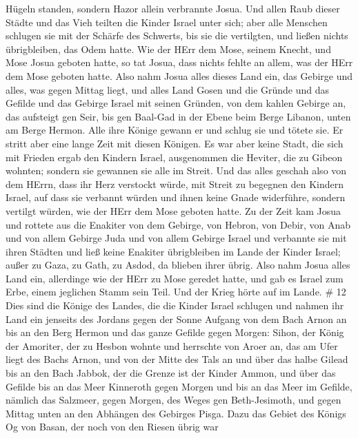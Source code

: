 Hügeln standen, sondern Hazor allein verbrannte Josua.  Und
allen Raub dieser Städte und das Vieh teilten die Kinder Israel unter
sich; aber alle Menschen schlugen sie mit der Schärfe des Schwerts, bis
sie die vertilgten, und ließen nichts übrigbleiben, das Odem hatte.
 Wie der HErr dem Mose, seinem Knecht, und Mose Josua
geboten hatte, so tat Josua, dass nichts fehlte an allem, was der HErr
dem Mose geboten hatte.  Also nahm Josua alles dieses Land
ein, das Gebirge und alles, was gegen Mittag liegt, und alles Land Gosen
und die Gründe und das Gefilde und das Gebirge Israel mit seinen
Gründen,  von dem kahlen Gebirge an, das aufsteigt gen
Seir, bis gen Baal-Gad in der Ebene beim Berge Libanon, unten am Berge
Hermon. Alle ihre Könige gewann er und schlug sie und tötete sie.
 Er stritt aber eine lange Zeit mit diesen Königen.
 Es war aber keine Stadt, die sich mit Frieden ergab den
Kindern Israel, ausgenommen die Heviter, die zu Gibeon wohnten; sondern
sie gewannen sie alle im Streit.  Und das alles geschah
also von dem HErrn, dass ihr Herz verstockt würde, mit Streit zu
begegnen den Kindern Israel, auf dass sie verbannt würden und ihnen
keine Gnade widerführe, sondern vertilgt würden, wie der HErr dem Mose
geboten hatte.  Zu der Zeit kam Josua und rottete aus die
Enakiter von dem Gebirge, von Hebron, von Debir, von Anab und von allem
Gebirge Juda und von allem Gebirge Israel und verbannte sie mit ihren
Städten  und ließ keine Enakiter übrigbleiben im Lande der
Kinder Israel; außer zu Gaza, zu Gath, zu Asdod, da blieben ihrer übrig.
 Also nahm Josua alles Land ein, allerdinge wie der HErr zu
Mose geredet hatte, und gab es Israel zum Erbe, einem jeglichen Stamm
sein Teil. Und der Krieg hörte auf im Lande. \# 12  Dies
sind die Könige des Landes, die die Kinder Israel schlugen und nahmen
ihr Land ein jenseits des Jordans gegen der Sonne Aufgang von dem Bach
Arnon an bis an den Berg Hermon und das ganze Gefilde gegen Morgen:
 Sihon, der König der Amoriter, der zu Hesbon wohnte und
herrschte von Aroer an, das am Ufer liegt des Bachs Arnon, und von der
Mitte des Tals an und über das halbe Gilead bis an den Bach Jabbok, der
die Grenze ist der Kinder Ammon,  und über das Gefilde bis
an das Meer Kinneroth gegen Morgen und bis an das Meer im Gefilde,
nämlich das Salzmeer, gegen Morgen, des Weges gen Beth-Jesimoth, und
gegen Mittag unten an den Abhängen des Gebirges Pisga.  Dazu
das Gebiet des Königs Og von Basan, der noch von den Riesen übrig war
